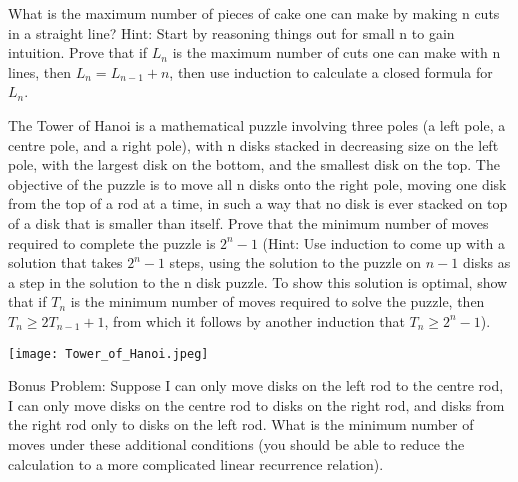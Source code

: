 \documentclass{exam}
\begin{document}
\begin{questions}
\question What is the maximum number of pieces of cake one can make by making n cuts in a straight line? Hint: Start by reasoning things out for small n to gain intuition. Prove that if $L_n$ is the maximum number of cuts one can make with n lines, then $L_n = L_{n-1} + n$, then use induction to calculate a closed formula for $L_n$.
\vspace{10em}

\question The Tower of Hanoi is a mathematical puzzle involving three poles (a left pole, a centre pole, and a right pole), with n disks stacked in decreasing size on the left pole, with the largest disk on the bottom, and the smallest disk on the top. The objective of the puzzle is to move all n disks onto the right pole, moving one disk from the top of a rod at a time, in such a way that no disk is ever stacked on top of a disk that is smaller than itself. Prove that the minimum number of moves required to complete the puzzle is $2^n - 1$ (Hint: Use induction to come up with a solution that takes $2^n - 1$ steps, using the solution to the puzzle on $n-1$ disks as a step in the solution to the n disk puzzle. To show this solution is optimal, show that if $T_n$ is the minimum number of moves required to solve the puzzle, then $T_n \geq 2T_{n-1} + 1$, from which it follows by another induction that $T_n \geq 2^n - 1$).

\begin{center}
\texttt{[image: Tower\_of\_Hanoi.jpeg]}
\end{center}

Bonus Problem: Suppose I can only move disks on the left rod to the centre rod, I can only move disks on the centre rod to disks on the right rod, and disks from the right rod only to disks on the left rod. What is the minimum number of moves under these additional conditions (you should be able to reduce the calculation to a more complicated linear recurrence relation).
\vspace{10em}

\end{questions}
\end{document}
